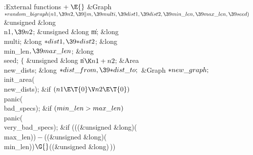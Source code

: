\Y\B\4:External functions\X${}\mathrel+\E{}$\6
\1\1\&{Graph} ${}{*}\\{random\_bigraph}(\\{n1},\39\\{n2},\39\|m,\39\\{multi},%
\39\\{dist1},\39\\{dist2},\39\\{min\_len},\39\\{max\_len},\39\\{seed}){}$\6
\&{unsigned} \&{long} \\{n1}${},\39\\{n2}{}$;\6
\&{unsigned} \&{long} \|m;\6
\&{long} \\{multi};\6
\&{long} ${}{*}\\{dist1},\39{*}\\{dist2}{}$;\6
\&{long} \\{min\_len}${},\39\\{max\_len}{}$;\6
\&{long} \\{seed};\2\2\6
${}\{{}$\5
\1\&{unsigned} \&{long} \|n${}\K\\{n1}+\\{n2}{}$;%
\6
\&{Area} \\{new\_dists};\6
\&{long} ${}{*}\\{dist\_from},\39{*}\\{dist\_to};{}$\6
\&{Graph} ${}{*}\\{new\_graph};{}$\7
\\{init\_area}(\\{new\_dists});\6
\&{if} ${}(\\{n1}\E\T{0}\V\\{n2}\E\T{0}){}$\1\5
\\{panic}(\\{bad\_specs});\2\6
\&{if} ${}(\\{min\_len}>\\{max\_len}){}$\1\5
\\{panic}(\\{very\_bad\_specs});\2\6
\&{if} (((\&{unsigned} \&{long})(\\{max\_len}))${}-{}$((\&{unsigned} \&{long})(%
\\{min\_len}))${}\G{}$((\&{unsigned} \&{long})\,))\1\5

